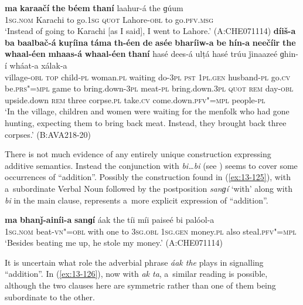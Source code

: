 \ea
\label{ex:13-123}
\gll \textbf{ma} \textbf{karaačí} \textbf{the} \textbf{béem} \textbf{thaní} laahur-á the  ɡúum \\
\textsc{1sg.nom} Karachi to go.\textsc{1sg} \textsc{quot} Lahore-\textsc{obl} to go.\textsc{pfv.msg} \\
\glt `Instead of going to Karachi [as I said], I went to Lahore.' (A:CHE071114)
\ex
\label{ex:13-124}
\gll \textbf{díiš-a} \textbf{ba} \textbf{baalbač-á} \textbf{kuṛíina} \textbf{táma} \textbf{th-éen} \textbf{de} \textbf{asée} \textbf{bharíiw-a} \textbf{be} \textbf{hín-a} \textbf{neečíir} \textbf{the} \textbf{whaal-éen} \textbf{mhaas-á} \textbf{whaal-éen} \textbf{thaní} hasé dees-á ulṭá hasé trúu ǰinaazeé ɡhin-í wháat-a xálak-a\\
village-\textsc{obl} \textsc{top} child-\textsc{pl} woman.\textsc{pl} waiting do-\textsc{3pl}
\textsc{pst} \textsc{1pl.gen} husband-\textsc{pl} go.\textsc{cv} be.\textsc{prs"=mpl} game to
bring.down-\textsc{3pl} meat-\textsc{pl} bring.down.\textsc{3pl} \textsc{quot} \textsc{rem} day-\textsc{obl} upside.down \textsc{rem} three corpse.\textsc{pl} take.\textsc{cv} come.down.\textsc{pfv"=mpl} people-\textsc{pl}\\
\glt `In the village, children and women were waiting for the menfolk who had gone hunting, expecting them to bring back meat. Instead, they brought back three corpses.' (B:AVA218-20) 
\z

 There is not much evidence of any entirely unique construction expressing additive semantics. Instead the conjunction with \textit{bi{\ldots}bi} (see ) seems to cover some occurrences of ``addition''. Possibly the construction found in (\ref{ex:13-125}), with a~subordinate Verbal Noun followed by the postposition \textit{sanɡí} `with' along with \textit{bi} in the main clause, represents a~more explicit expression of ``addition''. 

\begin{exe}
\ex
\label{ex:13-125}
\gll \textbf{ma} \textbf{bhanǰ-ainíi-a} \textbf{sanɡí} áak the tíi míi  paiseé bi palóol-a \\
\textsc{1sg.nom} beat-\textsc{vn"=obl} with one to \textsc{3sg.obl} \textsc{1sg.gen} money.\textsc{pl}  also steal.\textsc{pfv"=mpl} \\
\glt `Besides beating me up, he stole my money.' (A:CHE071114) 
\end{exe}

It is uncertain what role the adverbial phrase \textit{áak the} plays in signalling ``addition''. In (\ref{ex:13-126}), now with \textit{ak ta}, a~similar reading is possible, although the two clauses here are symmetric rather than one of them being subordinate to the other.


